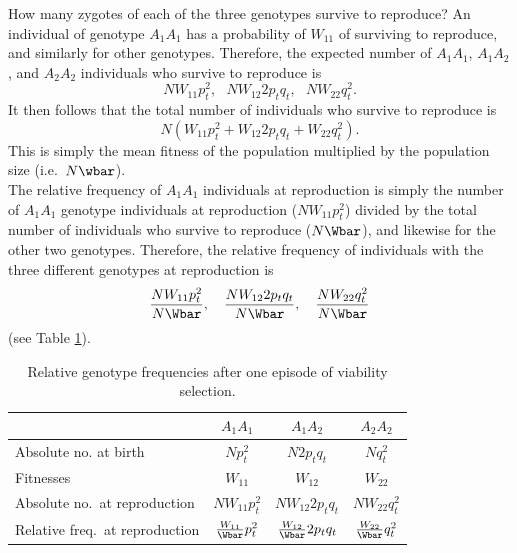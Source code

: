 How many zygotes of each of the three genotypes survive to reproduce? 
An individual of genotype $A_1A_1$ has a probability of $W_{11}$ of
surviving to reproduce, and similarly for other genotypes. Therefore, the expected number of $A_1A_1$, $A_1A_2$, and $A_2A_2$ individuals who survive to reproduce is
\begin{equation}
	NW_{11} p_t^2, ~~~ NW_{12} 2p_tq_t , ~~~ N W_{22} q_t^2.
\end{equation}
It then follows that the total number of individuals who survive to
reproduce is
\begin{equation}
	N \left(W_{11} p_t^2+W_{12} 2p_tq_t  +  W_{22} q_t^2 \right).
\end{equation}
This is simply the mean fitness of the population multiplied by the
population size (i.e.\ $N \wbar$).\\

The relative frequency of $A_1A_1$ individuals at reproduction
is simply the number of $A_1A_1$ genotype individuals at reproduction ($NW_{11} p_t^2$)
divided by the total number of individuals who survive to reproduce
($N \Wbar$), and likewise for the other two genotypes.
Therefore, the relative frequency of individuals with the three different genotypes at reproduction is
\begin{equation}
	\frac{NW_{11} p_t^2}{N\Wbar}, ~~~ \frac{NW_{12} 2p_tq_t}{N\Wbar} , ~~~ \frac{N W_{22} q_t^2}{N\Wbar}
\end{equation}
(see Table \ref{dip_fitness_table}).\\

\begin{table}
\begin{center}
\begin{tabular}{lccc}
\hline
& $A_1A_1$ & $A_1A_2$ & $A_2A_2$\\
\hline
Absolute no. at birth & $Np_t^2$ & $N2p_tq_t$ & $Nq_t^2$\\
Fitnesses & $W_{11}$ & $W_{12}$& $W_{22}$\\
Absolute no.\ at reproduction & $NW_{11} p_t^2$ & $NW_{12} 2p_tq_t$& $N W_{22} q_t^2$\\
Relative freq.\ at reproduction & $ \frac{W_{11}}{\Wbar} p_{t}^2$ & $ \frac{W_{12}}{\Wbar} 2 p_{t} q_{t}$ & $\frac{W_{22}}{\Wbar} q_{t}^2$\\
\end{tabular}
\end{center}
\caption{Relative genotype frequencies after one episode of viability selection.} \label{dip_fitness_table}
\end{table}

